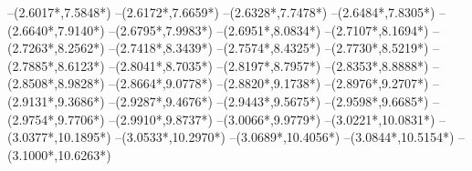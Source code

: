 {	--({2.6017*\dx},{7.5848*\dy})
	--({2.6172*\dx},{7.6659*\dy})
	--({2.6328*\dx},{7.7478*\dy})
	--({2.6484*\dx},{7.8305*\dy})
	--({2.6640*\dx},{7.9140*\dy})
	--({2.6795*\dx},{7.9983*\dy})
	--({2.6951*\dx},{8.0834*\dy})
	--({2.7107*\dx},{8.1694*\dy})
	--({2.7263*\dx},{8.2562*\dy})
	--({2.7418*\dx},{8.3439*\dy})
	--({2.7574*\dx},{8.4325*\dy})
	--({2.7730*\dx},{8.5219*\dy})
	--({2.7885*\dx},{8.6123*\dy})
	--({2.8041*\dx},{8.7035*\dy})
	--({2.8197*\dx},{8.7957*\dy})
	--({2.8353*\dx},{8.8888*\dy})
	--({2.8508*\dx},{8.9828*\dy})
	--({2.8664*\dx},{9.0778*\dy})
	--({2.8820*\dx},{9.1738*\dy})
	--({2.8976*\dx},{9.2707*\dy})
	--({2.9131*\dx},{9.3686*\dy})
	--({2.9287*\dx},{9.4676*\dy})
	--({2.9443*\dx},{9.5675*\dy})
	--({2.9598*\dx},{9.6685*\dy})
	--({2.9754*\dx},{9.7706*\dy})
	--({2.9910*\dx},{9.8737*\dy})
	--({3.0066*\dx},{9.9779*\dy})
	--({3.0221*\dx},{10.0831*\dy})
	--({3.0377*\dx},{10.1895*\dy})
	--({3.0533*\dx},{10.2970*\dy})
	--({3.0689*\dx},{10.4056*\dy})
	--({3.0844*\dx},{10.5154*\dy})
	--({3.1000*\dx},{10.6263*\dy})
}

